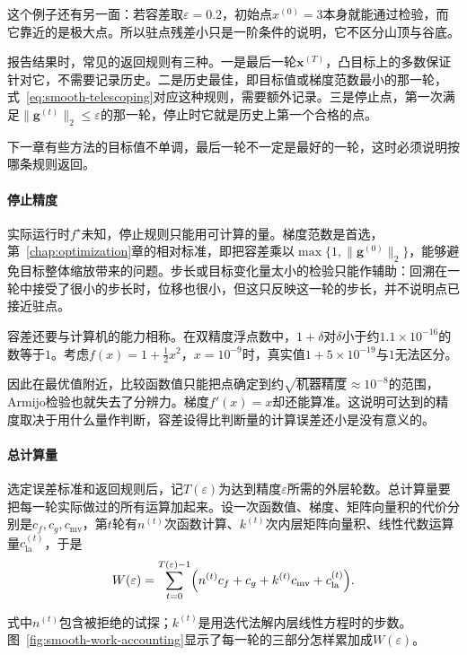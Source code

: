 这个例子还有另一面：若容差取$\varepsilon=0.2$，初始点$x^{(0)}=3$本身就能通过检验，而它靠近的是极大点。所以驻点残差小只是一阶条件的说明，它不区分山顶与谷底。

报告结果时，常见的返回规则有三种。一是最后一轮$\bm{x}^{(T)}$，凸目标上的多数保证针对它，不需要记录历史。二是历史最佳，即目标值或梯度范数最小的那一轮，式~\eqref{eq:smooth-telescoping}对应这种规则，需要额外记录。三是停止点，第一次满足$\lVert\bm{g}^{(t)}\rVert_2\leq\varepsilon$的那一轮，停止时它就是历史上第一个合格的点。

下一章有些方法的目标值不单调，最后一轮不一定是最好的一轮，这时必须说明按哪条规则返回。

\paragraph{停止精度}
实际运行时$f^\star$未知，停止规则只能用可计算的量。梯度范数是首选，第~\ref{chap:optimization}章的相对标准，即把容差乘以$\max\{1,\lVert\bm{g}^{(0)}\rVert_2\}$，能够避免目标整体缩放带来的问题。步长或目标变化量太小的检验只能作辅助：回溯在一轮中接受了很小的步长时，位移也很小，但这只反映这一轮的步长，并不说明点已接近驻点。

容差还要与计算机的能力相称。在双精度浮点数中，$1+\delta$对$\delta$小于约$1.1\times10^{-16}$的数等于$1$。考虑$f(x)=1+\frac12x^2$，$x=10^{-9}$时，真实值$1+5\times10^{-19}$与$1$无法区分。

因此在最优值附近，比较函数值只能把点确定到约$\sqrt{\text{机器精度}}\approx10^{-8}$的范围，Armijo检验也就失去了分辨力。梯度$f'(x)=x$却还能算准。这说明可达到的精度取决于用什么量作判断，容差设得比判断量的计算误差还小是没有意义的。

\paragraph{总计算量}
选定误差标准和返回规则后，记$T(\varepsilon)$为达到精度$\varepsilon$所需的外层轮数。总计算量要把每一轮实际做过的所有运算加起来。设一次函数值、梯度、矩阵向量积的代价分别是$c_f,c_g,c_{\mathrm{mv}}$，第$t$轮有$n^{(t)}$次函数计算、$k^{(t)}$次内层矩阵向量积、线性代数运算量$c_{\mathrm{la}}^{(t)}$，于是
\begin{equation}
 W(\varepsilon)=\sum_{t=0}^{T(\varepsilon)-1}\Bigl(n^{(t)}c_f+c_g+k^{(t)}c_{\mathrm{mv}}+c_{\mathrm{la}}^{(t)}\Bigr).
 \label{eq:smooth-total-work}
\end{equation}

式中$n^{(t)}$包含被拒绝的试探；$k^{(t)}$是用迭代法解内层线性方程时的步数。图~\ref{fig:smooth-work-accounting}显示了每一轮的三部分怎样累加成$W(\varepsilon)$。

